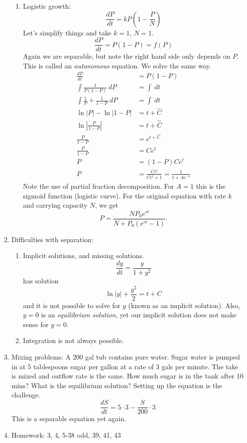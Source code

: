 \documentclass{article}
\begin{document}
\begin{enumerate}
\begin{enumerate}
\item Logistic growth: 
\[
\frac{dP}{dt} = k P\left( 1-\frac{P}{N} \right)
\]
Let's simplify things and take $k=1$, $N=1$. 
\[
\frac{dP}{dt} = P\left( 1-P \right) = f(P)
\]
Again we are separable, but note the right hand side only depends on $P$. This is called an \emph{autonomous} equation. We solve the same way.
\begin{align*}
\frac{dP}{dt} &= P\left( 1-P \right) \\
\int \frac{1}{P(1-P)} ~dP &= \int ~dt \\
\int \frac{1}{P} + \frac{1}{1-P} ~dP &= \int ~dt \\
\ln|P|-\ln|1-P| &= t+\hat{C} \\
\ln\left|\frac{P}{1-P}\right| &= t+\hat{C} \\
\frac{P}{1-P} &= e^{t+\hat{C}} \\
\frac{P}{1-P} &= Ce^{t} \\
P &= (1-P)Ce^{t} \\
P &= \frac{Ce^t}{Ce^t+1}  = \frac{1}{1+Ae^{-t}} 
\end{align*}
Note the use of partial fraction decomposition. For $A=1$ this is the sigmoid function (logistic curve). For the original equation with rate $k$ and carrying capacity $N$, we get
\[
P = \frac{NP_0e^{rt}}{N+P_0(e^{rt}-1)}.
\]
\end{enumerate}


\item Difficulties with separation:
\begin{enumerate}
\item Implicit solutions, and missing solutions.
\[
\frac{dy}{dt} = \frac{y}{1+y^2}
\]
has solution
\[
\ln|y| + \frac{y^2}{2} = t+C
\]
and it is not possible to solve for $y$ (known as an implicit solution). Also, $y=0$ is an \emph{equilibrium solution}, yet our implicit solution does not make sense for $y=0$.  

\item Integration is not always possible. 
\end{enumerate}

\item Mixing problems: A 200 gal tub contains pure water. Sugar water is pumped in at 5 tablespoons sugar per gallon at a rate of 3 gals per minute. The take is mixed and outflow rate is the same. How much sugar is in the tank after 10 mins? What is the equilibrium solution? Setting up the equation is the challenge.
\[
\frac{dS}{dt} = 5 \cdot 3 - \frac{S}{200} \cdot 3
\]
This is a separable equation yet again.

\item Homework: 3, 4, 5-38 odd, 39, 41, 43

\end{enumerate}
\end{document}
